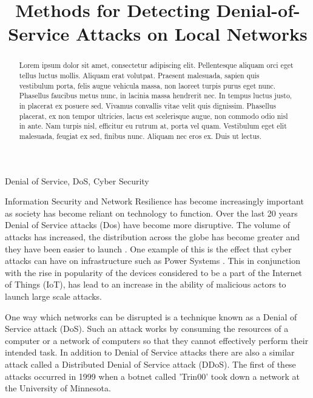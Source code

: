 \documentclass[conference, a4paper]{IEEEtran}
\begin{document}
\title{Methods for Detecting Denial-of-Service Attacks on Local Networks\\
}

\author{
}

\maketitle

\begin{abstract}
    Lorem ipsum dolor sit amet, consectetur adipiscing elit. Pellentesque aliquam orci eget tellus luctus mollis. Aliquam erat volutpat. Praesent malesuada, sapien quis vestibulum porta, felis augue vehicula massa, non laoreet turpis purus eget nunc. Phasellus faucibus metus nunc, in lacinia massa hendrerit nec. In tempus luctus justo, in placerat ex posuere sed. Vivamus convallis vitae velit quis dignissim. Phasellus placerat, ex non tempor ultricies, lacus est scelerisque augue, non commodo odio nisl in ante. Nam turpis nisl, efficitur eu rutrum at, porta vel quam. Vestibulum eget elit malesuada, feugiat ex sed, finibus nunc. Aliquam nec eros ex. Duis ut lectus.
    \newline
\end{abstract}

\begin{IEEEkeywords}
    Denial of Service, DoS, Cyber Security
\end{IEEEkeywords}

    Information Security and Network Resilience has become increasingly important as society has become reliant on technology to function.
    Over the last 20 years Denial of Service attacks (Dos) have become more disruptive. The volume of attacks has increased, the distribution across the globe has become greater and they have been easier to launch \cite{20_years_of_DDOS}.
    One example of this is the effect that cyber attacks can have on infrastructure such as Power Systems \cite{DDOS_power_systems}. 
    This in conjunction with the rise in popularity of the devices considered to be a part of the Internet of Things (IoT), has lead to an increase in the ability of malicious actors to launch large scale attacks.

    One way which networks can be disrupted is a technique known as a Denial of Service attack (DoS).
    Such an attack works by consuming the resources of a computer or a network of computers so that they cannot effectively perform their intended task.
    In addition to Denial of Service attacks there are also a similar attack called a Distributed Denial of Service attack (DDoS).
    The first of these attacks occurred in 1999 when a botnet called 'Trin00' took down a network at the University of Minnesota. \cite{CERT_DDOS}
\end{document}
